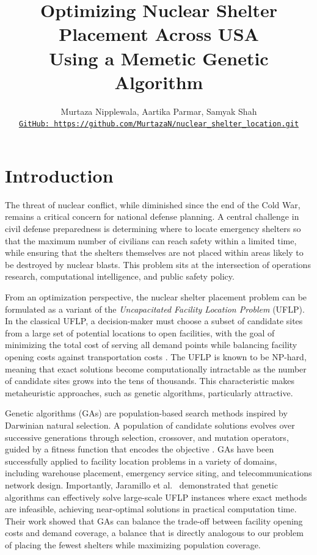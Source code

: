 \documentclass[12pt]{article}
\title{Optimizing Nuclear Shelter Placement Across USA\\Using a Memetic Genetic Algorithm}
\author{
Murtaza Nipplewala, Aartika Parmar, Samyak Shah \\
\small \href{https://github.com/MurtazaN/nuclear_shelter_location.git}{\nolinkurl{GitHub: https://github.com/MurtazaN/nuclear_shelter_location.git}}
}
\date{}
\begin{document}
\maketitle

\section{Introduction}

The threat of nuclear conflict, while diminished since the end of the Cold War, remains a critical concern for national defense planning. A central challenge in civil defense preparedness is determining where to locate emergency shelters so that the maximum number of civilians can reach safety within a limited time, while ensuring that the shelters themselves are not placed within areas likely to be destroyed by nuclear blasts. This problem sits at the intersection of operations research, computational intelligence, and public safety policy.

From an optimization perspective, the nuclear shelter placement problem can be formulated as a variant of the \textit{Uncapacitated Facility Location Problem} (UFLP). In the classical UFLP, a decision-maker must choose a subset of candidate sites from a large set of potential locations to open facilities, with the goal of minimizing the total cost of serving all demand points while balancing facility opening costs against transportation costs \cite{cornuejols1990}. The UFLP is known to be NP-hard, meaning that exact solutions become computationally intractable as the number of candidate sites grows into the tens of thousands. This characteristic makes metaheuristic approaches, such as genetic algorithms, particularly attractive.

Genetic algorithms (GAs) are population-based search methods inspired by Darwinian natural selection. A population of candidate solutions evolves over successive generations through selection, crossover, and mutation operators, guided by a fitness function that encodes the objective \cite{holland1992}. GAs have been successfully applied to facility location problems in a variety of domains, including warehouse placement, emergency service siting, and telecommunications network design. Importantly, Jaramillo et al.\ \cite{jaramillo2002} demonstrated that genetic algorithms can effectively solve large-scale UFLP instances where exact methods are infeasible, achieving near-optimal solutions in practical computation time. Their work showed that GAs can balance the trade-off between facility opening costs and demand coverage, a balance that is directly analogous to our problem of placing the fewest shelters while maximizing population coverage.
\end{document}

